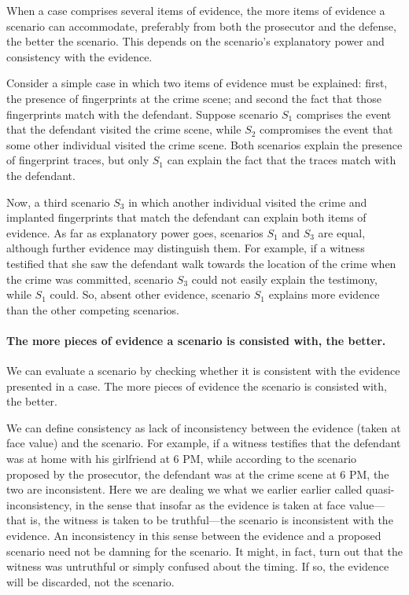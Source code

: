 \documentclass[10pt]{article}
\begin{document}
When a case comprises several items of evidence, 
 the more items of evidence a scenario can accommodate, preferably from both the prosecutor and the defense, 
 the better the scenario. This depends on the scenario's explanatory power and consistency with the evidence. 
 
 Consider a simple case in which two items of evidence must be explained: first, the presence of fingerprints at the crime scene; 
and second the fact that those fingerprints match with the defendant.  Suppose scenario $S_1$ comprises the event that the 
defendant visited the crime scene, while $S_2$ compromises the event that some other individual visited the crime scene. Both scenarios 
explain the presence of fingerprint traces, but only $S_1$ can explain the fact that the traces match with the defendant. 

Now, a third scenario $S_3$ in which another individual visited the crime and  implanted fingerprints that match the defendant can explain both items of evidence. As far as explanatory power goes, scenarios $S_1$ and $S_3$ are equal, although further evidence may distinguish them. For example, if a witness testified that she saw the defendant walk towards the location of the crime when the crime was committed, scenario $S_3$ could 
not easily explain the testimony, while $S_1$ could. So, absent other evidence, scenario $S_1$ explains more evidence than the other competing scenarios. 
 

\paragraph{The more pieces of evidence a scenario is consisted with, the better.}

We can evaluate a scenario by checking whether it is 
consistent with the evidence presented in a case. 
The more pieces of evidence the scenario 
is consisted with, the better.

We can define consistency as lack of inconsistency between the evidence (taken at face value) and the scenario. 
For example, if a witness testifies that the defendant was at home with his girlfriend 
at 6 PM, while according to the scenario proposed by the prosecutor, 
the defendant was at the crime scene at 6 PM, the 
two are inconsistent. Here we are dealing we what we earlier earlier called quasi-inconsistency, in the sense that
insofar as the evidence is taken at face value---that is, the witness is taken to be truthful---the scenario 
is inconsistent with the evidence. An inconsistency in this sense between the evidence and a proposed scenario need 
not be damning for the scenario.  It might, in fact, turn out that the witness was untruthful or simply confused about 
the timing.  If so, the evidence will be discarded, not the scenario. 
\end{document}

